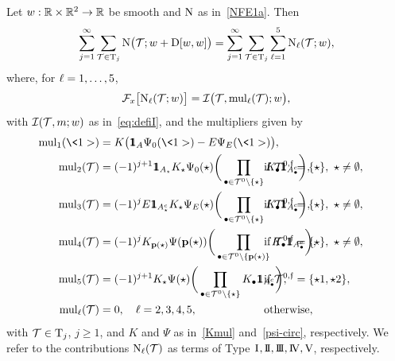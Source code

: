 \begin{lemma}
\label{LEM:wint}
Let $w:\mathbb{R} \times \mathbb{R}^2 \to \mathbb{R}$ be smooth and $\mathrm{N}$ as in~\eqref{NFE1a}. Then
\begin{align}
\label{wint0a}
\sum_{j=1}^\infty \sum_{\mathcal{T}\in \mathrm{T}_j} \mathrm{N}\big(\mathcal{T}; w+ \mathrm{D}[w, w] \big)
=
\sum_{j=1}^\infty \sum_{\mathcal{T}\in\mathrm{T}_j} \sum_{\ell=1}^5  \mathrm{N}_\ell(\mathcal{T}; w),
\end{align}
where, for $\ell = 1,\dots,5$,
\begin{align}
\label{wint0b}
{\mathcal{F}}_x \big[ \mathrm{N}_\ell (\mathcal{T}; w) \big] = \mathcal{I} \big(\mathcal{T}, {\operatorname{mul}}_\ell(\mathcal{T}); w \big),
\end{align}
with $\mathcal{I}(\mathcal{T}, m; w)$ as in~\eqref{eq:defiI}, and the multipliers given by
\begin{align}
\label{eq:multiplicadores}
\mul_1(\<1>) &= K\big(\ind_A  \Psi_0(\<1>) - E\Psi_E(\<1>)\big), \\
\mul_2(\TT) &=(-1)^{j+1} \ind_{A_\star} K_\star\Psi_0(\star) \bigg( \prod_{\bul \in \TT^0 \setminus\{\star\}}  K_\bul  \ind_{A_\bul^c} \bigg),
   && \hspace{-2.0cm}\text{if} \  \TT^{0,\ff} = \{\star\}, \ \star\neq \emptyset, \nonumber\\
\mul_3(\TT) &=(-1)^{j} E  \ind_{A_\star^c} K_\star\Psi_E(\star) \bigg( \prod_{\bul \in \TT^0 \setminus\{\star\}}  K_\bul  \ind_{A_\bul^c} \bigg),
   && \hspace{-2.0cm}\text{if} \  \TT^{0,\ff} = \{\star\}, \ \star\neq \emptyset, \nonumber\\
\mul_4(\TT) &=(-1)^{j}  K_{\pb(\star)}\Psi(\pb(\star)) \bigg( \prod_{\bul \in \TT^0 \setminus\{\pb(\star)\}}  K_\bul  \ind_{A_\bul^c} \bigg),
   && \hspace{-2.0cm}\text{if} \  \TT^{0,\ff} = \{\star\},  \ \star\neq \emptyset, \label{wint0c}\\
\mul_5(\TT) &=(-1)^{j+1}  K_\star\Psi(\star) \bigg( \prod_{\bul \in \TT^0 \setminus\{\star\}}  K_\bul  \ind_{A_\bul^c} \bigg),
   && \hspace{-2.0cm}\text{if} \  \TT^{0,\ff} = \{\star1, \star2\}, \nonumber\\
\mul_\l(\TT) &= 0, \quad \l=2,3,4,5, && \hspace{-2.0cm}\text{otherwise}, \nonumber
\end{align}
with $\mathcal{T}\in \mathrm{T}_j$, $j \ge 1$, and $K$ and $\Psi$ as in~\eqref{Kmul} and~\eqref{psi-circ}, respectively. We refer to the contributions $\mathrm{N}_\ell(\mathcal{T})$ as terms of Type $\I, \II, \III, \IV, \5$, respectively.
\end{lemma}

